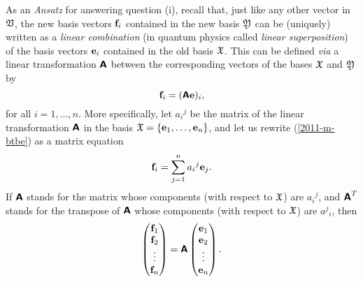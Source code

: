 As an {\it Ansatz} for answering question (i), recall that, just like any other vector in ${\frak V}$,
the new basis vectors ${\bf f}_i$ contained in the new basis ${\frak Y}$
can be (uniquely) written as a {\em linear combination}
(in quantum physics called {\em linear superposition})
of the basis vectors
${\bf e}_i$ contained in the old  basis ${\frak X}$.
This can be defined {\it via}
a linear transformation $\textsf{\textbf{A}}$ between the corresponding vectors of the bases
 ${\frak X}$ and
${\frak Y}$ by
\begin{equation}
{\bf f}_i= (\textsf{\textbf{A}}{\bf e})_i
,
\label{2011-m-btbe}
\end{equation}
for all $i=1, \ldots , n$.
%
More specifically, let ${a_i}^j$ be the matrix of the linear transformation $\textsf{\textbf{A}}$
in the basis
${\frak X}
=
\{
{\bf e}_1,
\ldots ,
{\bf e}_n
\}$,
and let us rewrite (\ref{2011-m-btbe}) as a matrix equation
\begin{equation}
{\bf f}_i= \sum_{j=1}^n {a_i}^j {\bf e}_j
.
\label{2011-m-btbe-r}
\end{equation}
If $\textsf{\textbf{A}}$ stands for the matrix whose components (with respect to ${\frak X}$) are  ${a_i}^j$,
and $\textsf{\textbf{A}}^T$
stands for the transpose of $\textsf{\textbf{A}}$
whose components (with respect to ${\frak X}$) are  ${a^j}_i$,
then
\begin{equation}
\begin{pmatrix}
{\bf f}_1\\
{\bf f}_2\\
\vdots\\
{\bf f}_n
\end{pmatrix}
= \textsf{\textbf{A}}
\begin{pmatrix}
{\bf e}_1\\
{\bf e}_2\\
\vdots\\
{\bf e}_n
\end{pmatrix}
.
\label{2011-m-btbe-r1}
\end{equation}

